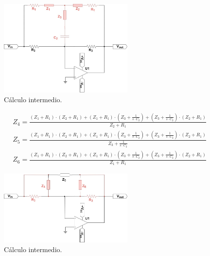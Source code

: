 \begin{figure}[H]
    \centering
    \includegraphics[width=0.6\textwidth]{../EJ5/latex_resources/Z4_5_and_6}
    \caption{Cálculo intermedio.}
    \label{fig:Z456}
\end{figure}

\begin{align}
    &Z_4 = \frac{\left(Z_1 + R_1\right) \cdot \left(Z_2 + R_1\right) + \left(Z_1 + R_1\right) \cdot \left(Z_3 + \frac{1}{s \cdot C_2}\right) + \left(Z_3 + \frac{1}{s \cdot C_2}\right) \cdot \left(Z_2 + R_1\right)}{Z_2 + R_1}  \label{eq:ej5_z4} \\
    &Z_5 = \frac{\left(Z_1 + R_1\right) \cdot \left(Z_2 + R_1\right) + \left(Z_1 + R_1\right) \cdot \left(Z_3 + \frac{1}{s \cdot C_2}\right) + \left(Z_3 + \frac{1}{s \cdot C_2}\right) \cdot \left(Z_2 + R_1\right)}{Z_3 + \frac{1}{s \cdot C_2}}  \label{eq:ej5_z5} \\
    &Z_6 = \frac{\left(Z_1 + R_1\right) \cdot \left(Z_2 + R_1\right) + \left(Z_1 + R_1\right) \cdot \left(Z_3 + \frac{1}{s \cdot C_2}\right) + \left(Z_3 + \frac{1}{s \cdot C_2}\right) \cdot \left(Z_2 + R_1\right)}{Z_1 + R_1}  \label{eq:ej5_z6}
\end{align}

\begin{figure}[H]
    \centering
    \includegraphics[width=0.6\textwidth]{../EJ5/latex_resources/Z7_and_8}
    \caption{Cálculo intermedio.}
    \label{fig:Z78}
\end{figure}

